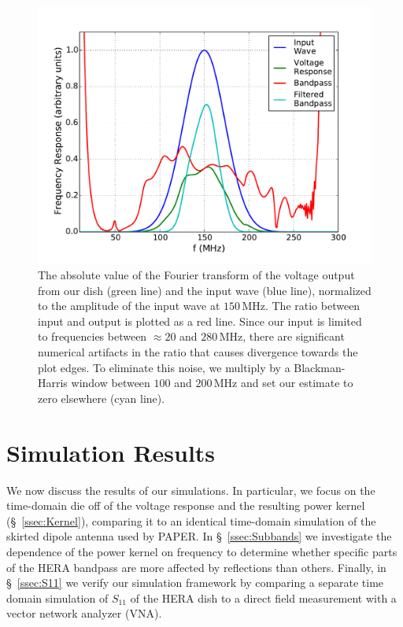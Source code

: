 \documentclass[twocolumn]{emulateapj}
\begin{document}
\begin{figure}[h!]
\includegraphics[width=.5\textwidth]{figures/frequency_domain.pdf}
\caption{The absolute value of the Fourier transform of the voltage output from our dish (green line) and the input wave (blue line), normalized to the amplitude of the input wave at $150$\,MHz. The ratio between input and output is plotted as a red line. Since our input is limited to frequencies between $\approx 20$ and $280$\,MHz, there are significant numerical artifacts in the ratio that causes divergence towards the plot edges. To eliminate this noise, we multiply by a Blackman-Harris window between $100$ and $200$\,MHz and set our estimate to zero elsewhere (cyan line).}
\label{fig:FrequencyDomain}
\end{figure}


\section{Simulation Results}\label{sec:Results}

We now discuss the results of our simulations. In particular, we focus on the time-domain die off of the voltage response and the resulting power kernel (\S~\ref{ssec:Kernel}), comparing it to an identical time-domain simulation of the skirted dipole antenna used by PAPER. In \S~\ref{ssec:Subbands} we investigate the dependence of the power kernel on frequency to determine whether specific parts of the HERA bandpass are more affected by reflections than others. Finally, in \S~\ref{ssec:S11} we verify our simulation framework by comparing a separate time domain simulation of $S_{11}$ of the HERA dish to a direct field measurement with a vector network analyzer (VNA). 
\end{document}
